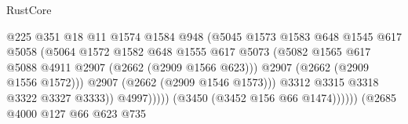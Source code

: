 \begin{lexlean}{RustCore}
\begin{coremodule}
                                                  @225
                                                  @351
                                                  @18
                                                  @11
                                                  @1574
                                                  @1584
                                                  @948
                                                  (@5045
                                                    @1573
                                                    @1583
                                                    @648
                                                    @1545
                                                    @617
                                                    @5058
                                                    (@5064
                                                      @1572
                                                      @1582
                                                      @648
                                                      @1555
                                                      @617
                                                      @5073
                                                      (@5082
                                                        @1565
                                                        @617
                                                        @5088
                                                        @4911
                                                        @2907
                                                        (@2662 (@2909 @1566 @623)))
                                                      @2907
                                                      (@2662 (@2909 @1556 @1572)))
                                                    @2907
                                                    (@2662 (@2909 @1546 @1573)))
                                                  @3312
                                                  @3315
                                                  @3318
                                                  @3322
                                                  @3327
                                                  @3333))
                                              @4997)))))
                                    (@3450 (@3452 @156 @66 @1474))))))
                            (@2685
                              @4000
                              @127
                              @66
                              @623
                              @735

\end{coremodule}
\end{lexlean}
